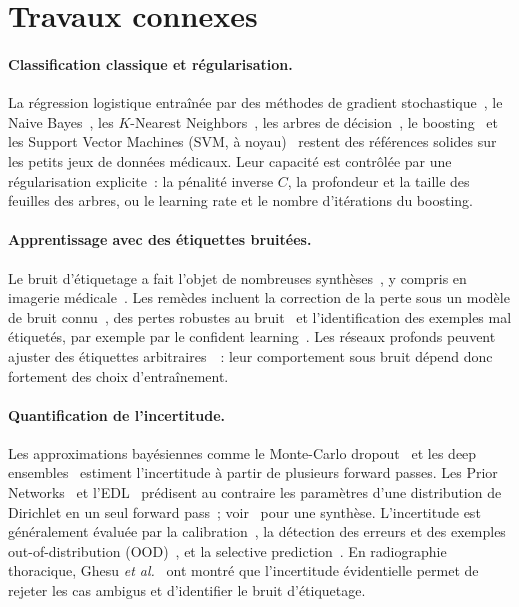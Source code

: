 \documentclass[11pt,a4paper]{article}
\begin{document}
\section{Travaux connexes}
\paragraph{Classification classique et régularisation.}
La régression logistique entraînée par des méthodes de gradient stochastique~\cite{robbins1951stochastic,bottou2010large},
le Naive Bayes~\cite{domingos1997optimality}, les $K$-Nearest Neighbors~\cite{beyer1999nearest}, les arbres de
décision~\cite{breiman1984classification}, le boosting~\cite{freund1997decision,friedman2001greedy} et les Support Vector
Machines (SVM, à noyau)~\cite{cortes1995support,scholkopf2002learning} restent des références solides sur les
petits jeux de données médicaux. Leur capacité est contrôlée par une régularisation explicite~: la pénalité inverse
$C$, la profondeur et la taille des feuilles des arbres, ou le learning rate et le nombre d'itérations du
boosting.

\paragraph{Apprentissage avec des étiquettes bruitées.}
Le bruit d'étiquetage a fait l'objet de nombreuses synthèses~\cite{frenay2014classification,song2022learning}, y compris
en imagerie médicale~\cite{karimi2020deep}. Les remèdes incluent la correction de la perte sous un modèle de bruit
connu~\cite{natarajan2013learning}, des pertes robustes au bruit~\cite{ghosh2017robust,zhang2018generalized} et
l'identification des exemples mal étiquetés, par exemple par le confident learning~\cite{northcutt2021confident}. Les
réseaux profonds peuvent ajuster des étiquettes arbitraires~\cite{zhang2017understanding}~: leur comportement sous bruit
dépend donc fortement des choix d'entraînement.

\paragraph{Quantification de l'incertitude.}
Les approximations bayésiennes comme le Monte-Carlo dropout~\cite{gal2016dropout} et les deep
ensembles~\cite{lakshminarayanan2017simple} estiment l'incertitude à partir de plusieurs forward passes. Les Prior
Networks~\cite{malinin2018prior} et l'EDL~\cite{sensoy2018evidential} prédisent au contraire les paramètres d'une
distribution de Dirichlet en un seul forward pass~; voir~\cite{ulmer2023prior} pour une synthèse. L'incertitude est
généralement évaluée par la calibration~\cite{guo2017calibration}, la détection des erreurs et des exemples out-of-distribution
(OOD)~\cite{hendrycks2017baseline}, et la selective prediction~\cite{geifman2017selective}. En radiographie
thoracique, Ghesu \emph{et al.}~\cite{ghesu2019quantifying,ghesu2021quantifying} ont montré que l'incertitude
évidentielle permet de rejeter les cas ambigus et d'identifier le bruit d'étiquetage.
\end{document}
